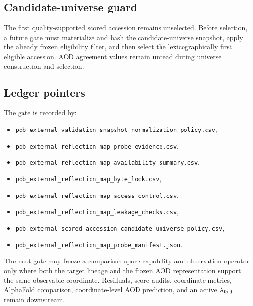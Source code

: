 \subsection{Candidate-universe guard}

The first quality-supported scored accession remains unselected. Before selection, a future gate must materialize and hash the candidate-universe snapshot, apply the already frozen eligibility filter, and then select the lexicographically first eligible accession. AOD agreement values remain unread during universe construction and selection.

\subsection{Ledger pointers}

The gate is recorded by:
\begin{itemize}
\item \texttt{pdb\_external\_validation\_snapshot\_normalization\_policy.csv},
\item \texttt{pdb\_external\_reflection\_map\_probe\_evidence.csv},
\item \texttt{pdb\_external\_reflection\_map\_availability\_summary.csv},
\item \texttt{pdb\_external\_reflection\_map\_byte\_lock.csv},
\item \texttt{pdb\_external\_reflection\_map\_access\_control.csv},
\item \texttt{pdb\_external\_reflection\_map\_leakage\_checks.csv},
\item \texttt{pdb\_external\_scored\_accession\_candidate\_universe\_policy.csv},
\item \texttt{pdb\_external\_reflection\_map\_probe\_manifest.json}.
\end{itemize}

The next gate may freeze a comparison-space capability and observation operator only where both the target lineage and the frozen AOD representation support the same observable coordinate. Residuals, score audits, coordinate metrics, AlphaFold comparison, coordinate-level AOD prediction, and an active $\lambda_{\rm fold}$ remain downstream.
